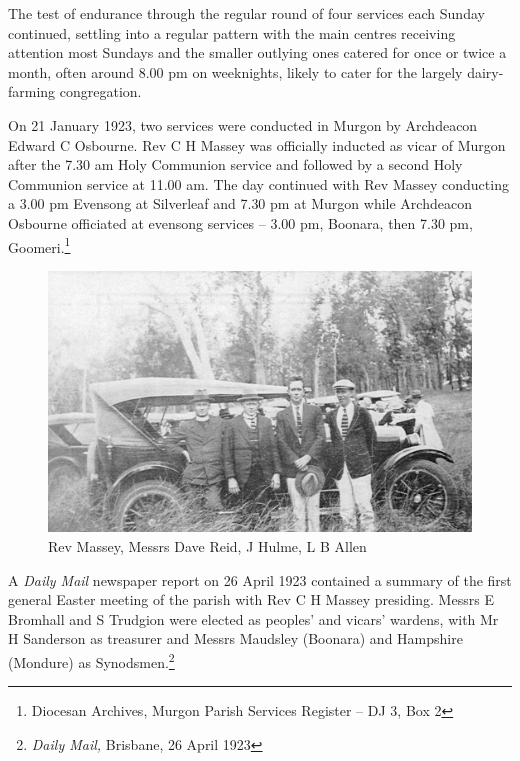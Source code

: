 The test of endurance through the regular round of four services each Sunday continued, settling into a regular pattern with the main centres receiving attention most Sundays and the smaller outlying ones catered for once or twice a month, often around 8.00 pm on weeknights, likely to cater for the largely dairy-farming congregation.



On 21 January 1923, two services were conducted in Murgon by Archdeacon Edward C Osbourne. Rev C H Massey was officially inducted as vicar of Murgon after the 7.30 am Holy Communion service and followed by a second Holy Communion service at 11.00 am. The day continued with Rev Massey conducting a 3.00 pm Evensong at Silverleaf and 7.30 pm at Murgon while Archdeacon Osbourne officiated at evensong services -- 3.00 pm, Boonara, then 7.30 pm, Goomeri.\footnote{Diocesan Archives, Murgon Parish Services Register -- DJ 3, Box 2}








\begin{figure}
\begin{center}
\includegraphics[width=1.\linewidth,center]{../images/masseyRACQ.jpg}
\caption{Rev Massey, Messrs Dave Reid, J Hulme, L B Allen}
\end{center}
\end{figure}




A \emph{Daily Mail} newspaper report on 26 April 1923 contained a summary of the first general Easter meeting of the parish with Rev C H Massey presiding. Messrs E Bromhall and S Trudgion were elected as peoples' and vicars' wardens, with Mr H Sanderson as treasurer and Messrs Maudsley (Boonara) and Hampshire (Mondure) as Synodsmen.\footnote{\emph{Daily Mail,} Brisbane, 26 April 1923}


